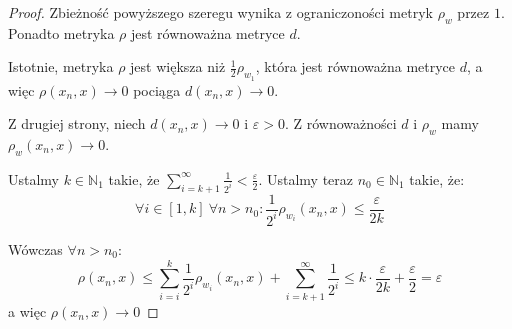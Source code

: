 \begin{thm}
\begin{proof}
    Zbieżność powyższego szeregu wynika z ograniczoności metryk $\rho_w$ przez $1$. Ponadto metryka $\rho$ jest równoważna metryce $d$.
    
    Istotnie, metryka $\rho$ jest większa niż $\frac{1}{2} \rho_{w_1}$, która jest równoważna metryce $d$, a więc $\rho(x_n, x) \to 0$ pociąga $d(x_n, x) \to 0$.
    
    Z drugiej strony, niech $d(x_n, x) \to 0$ i $\varepsilon > 0$. Z równoważności $d$ i $\rho_w$ mamy $\rho_w(x_n, x) \to 0$.
    
    Ustalmy $k \in \mathbb{N}_1$ takie, że $\sum_{i=k+1}^\infty \frac{1}{2^i} < \frac{\varepsilon}{2}$.
    Ustalmy teraz $n_0 \in \mathbb{N}_1$ takie, że:
    \[\forall i \in [1,k]\ \forall n > n_0: \frac{1}{2^i} \rho_{w_i}(x_n, x) \leq \frac{\varepsilon}{2k}\]
    
    Wówczas $\forall n > n_0$:
    \[\rho(x_n, x) \leq \sum_{i=i}^k \frac{1}{2^i} \rho_{w_i}(x_n, x) + \sum_{i=k+1}^\infty \frac{1}{2^i} \leq k \cdot \frac{\varepsilon}{2k} + \frac{\varepsilon}{2} = \varepsilon\]
    a więc $\rho(x_n, x) \to 0$
    

\end{proof}
\end{thm}
